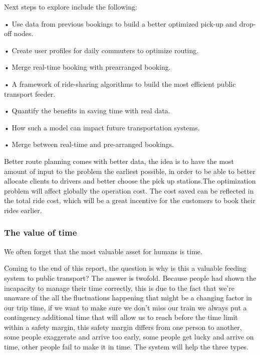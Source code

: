 \documentclass{article}
\begin{document}
Next steps to explore include the following:
\begin{list}{}
\item • Use data from previous bookings to build a better optimized pick-up and drop-off nodes.
\item • Create user profiles for daily commuters to optimize routing.
\item • Merge real-time booking with prearranged booking.
\item • A framework of ride-sharing algorithms to build the most efficient public transport feeder.
\item • Quantify the benefits in saving time with real data. 
\item •  How such a model can impact future transportation systems.
\item •  Merge between real-time and pre-arranged bookings.
\end{list}

Better route planning comes with better data, the idea is to have the most amount of input to the problem the earliest possible, in order to be able to better allocate clients to drivers and better choose the pick up stations.The optimization problem will affect globally the operation cost. The cost saved can be reflected in the total ride cost, which will be a great incentive for the customers to book their rides earlier.

\subsubsection*{The value of time}

\begin{flushright}
We often forget that the most valuable asset for humans is time.
\end{flushright}

Coming to the end of this report, the question is why is this a valuable feeding system to public transport?
The answer is twofold. 
 Because people had shown the incapacity to manage their time correctly, this is due to the fact that we\rq{re} unaware of the all the fluctuations happening that might be a changing factor in our trip time, if we want to make sure we don\rq{t} miss our train we always put a contingency additional time that will allow us to reach before the time limit within a safety margin, this safety margin differs from one person to another, some people exaggerate and arrive too early, some people get lucky and arrive on time, other people fail to 
make it in time. The system will help the three types. 
\end{document}
